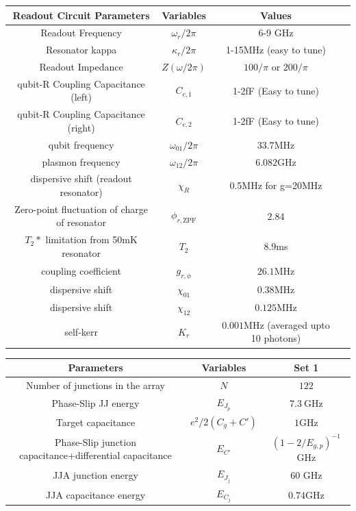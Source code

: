 \documentclass[%
reprint,
superscriptaddress,
 amsmath,amssymb,
 aps,
 prx,
longbibliography,
floatfix,
]{revtex4-2}
\begin{document}
\begin{table}[htb]
\begin{center}
\begin{tabular}{|c |c| c |c| }
 \hline
 \textbf{Readout Circuit Parameters} & \textbf{Variables} & \textbf{Values}\\ 
\hline
Readout Frequency&$\omega_r/2\pi$ &6-9 GHz\\
 \hline
 Resonator kappa&$\kappa_r/2\pi$ &1-15MHz (easy to tune)\\
 \hline
Readout Impedance & $Z(\omega/2\pi)$ & $100/\pi$ or $200/\pi$\\
 \hline
 qubit-R Coupling Capacitance (left) &$C_{c,1}$ &1-2fF (Easy to tune)\\
 \hline
 qubit-R Coupling Capacitance (right) &$C_{c,2}$ &1-2fF (Easy to tune)\\
 \hline
qubit frequency &$\omega_{01}/2\pi$&$33.7$MHz\\ 
 \hline
plasmon frequency &$\omega_{12}/2\pi$&$6.082$GHz\\ 
 \hline
dispersive shift (readout resonator) &$\chi_{R}$&0.5MHz for g=20MHz\\ 
 \hline
Zero-point fluctuation of charge of resonator &$\phi_{r,\mathrm{ZPF}}$&$2.84$\\
 \hline
$T_2*$ limitation from 50mK resonator &$T_2$&$8.9$ms\\
 \hline
coupling coefficient &$g_{r,\phi}$&$26.1$MHz\\
 \hline
dispersive shift &$\chi_{01}$&$0.38$MHz\\
 \hline
dispersive shift &$\chi_{12}$&$0.125$MHz\\
 \hline
self-kerr &$K_r$&$0.001$MHz (averaged upto 10 photons)\\
 \hline
 \end{tabular}
\end{center}
\begin{center}
\begin{tabular}{|c |c |c|}
 \hline
\textbf{Parameters}&\textbf{Variables} &Set 1\\ 
 \hline
Number of junctions in the array&$N$ &$122$\\ 
 \hline
Phase-Slip JJ energy&$E_{J_p}$ &$7.3 \ \mathrm{GHz}$\\ 
\hline
Target capacitance&$e^2/2(C_g+C')$ &$1$GHz\\ 
\hline
Phase-Slip junction capacitance+differential capacitance &$E_{C'}$ &$(1-2/E_{g,p})^{-1}$GHz\\ 
\hline
JJA junction energy&$E_{J_j}$&60 GHz\\ 
\hline
JJA capacitance energy&$E_{C_j}$&$0.74$GHz\\ 

\end{tabular}
\end{center}
\end{table}
\end{document}
